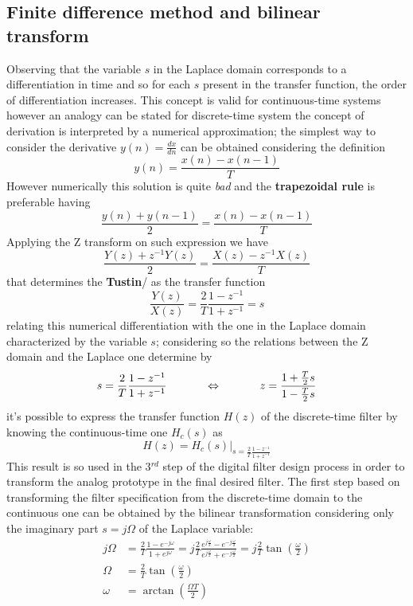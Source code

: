 	\subsection{Finite difference method and bilinear transform}
		Observing that the variable $s$ in the Laplace domain corresponds to a differentiation in time and so for each $s$ present in the transfer function, the order of differentiation increases. This concept is valid for continuous-time systems however an analogy can be stated for discrete-time system the concept of derivation is interpreted by a numerical approximation; the simplest way to consider the derivative $y(n) = \frac{dx}{dn}$ can be obtained considering the definition
		\[ y(n) = \frac{x(n) - x(n-1)}{T} \]
		However numerically this solution is quite \textit{bad} and the \textbf{trapezoidal rule} is preferable having
		\begin{equation}
			\frac{y(n) + y(n-1)} 2 = \frac{x(n) - x(n-1)}{T}
		\end{equation}
		Applying the Z transform on such expression we have
		\[ \frac{Y(z) + z^{-1}Y(z)}{2} = \frac{X(z) - z^{-1}X(z)}{T} \]
		that determines the \textbf{Tustin}/ as the transfer function
		\[\frac{Y(z)}{X(z)} = \frac 2 T \frac{1-z^{-1}}{1+z^{-1}} = s\]
		relating this numerical differentiation with the one in the Laplace domain characterized by the variable $s$; considering so the relations between the Z domain and the Laplace one determine by
		\begin{equation}
			s =  \frac 2 T \frac{1-z^{-1}}{1+z^{-1}} \hspace{1.2cm} \Leftrightarrow \hspace{1.2cm} z = \frac{1 + \frac T2s}{1-\frac T2s}
		\end{equation}
		it's possible to express the transfer function $H(z)$ of the discrete-time filter by knowing the continuous-time one $H_c(s)$ as
		\begin{equation} \label{eq:filt:bilinear}
			H(z) = H_c(s) \Big|_{s =  \frac 2 T \frac{1-z^{-1}}{1+z^{-1}}}
		\end{equation}
		This result is so used in the 3$^{rd}$ step of the digital filter design process in order to transform the analog prototype in the final desired filter. The first step based on transforming the filter specification from the discrete-time domain to the continuous one can be obtained by the bilinear transformation considering only the imaginary part $s=j\Omega$ of the Laplace variable:
		\begin{equation} \label{eq:filt:freqchange}
		\begin{aligned}
			j\Omega & = \frac 2 T \frac{1-e^{-j\omega}}{1+e^{j\omega}} = j \frac 2 T \frac{ e^{j\frac\omega2} - e^{-j\frac\omega2} }{e^{j\frac\omega2} + e^{-j\frac\omega2}} = j \frac 2 T \tan \left( \frac \omega 2 \right) \\
			\Omega & = \frac 2 T \tan \left( \frac \omega 2 \right) \\
			\omega & = \arctan \left( \frac{\Omega T}{2} \right)
		\end{aligned}
		\end{equation}
